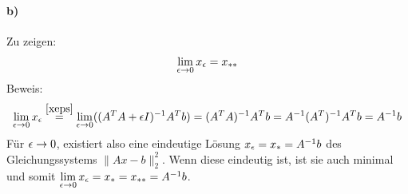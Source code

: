 \paragraph*{b)}
Zu zeigen:
\begin{align*}\lim\limits_{\epsilon \rightarrow 0}{x_\epsilon} = x_{**}\end{align*}
Beweis:
\begin{align}
\lim\limits_{\epsilon \rightarrow 0}{x_\epsilon}\overset{\eqref{xeps}}{=}\lim\limits_{\epsilon \rightarrow 0}((A^TA + \epsilon I)^{-1}A^Tb)=(A^TA)^{-1}A^Tb=A^{-1}(A^{T})^{-1}A^Tb=A^{-1}b
\end{align}
Für $\epsilon\rightarrow 0$, existiert also eine eindeutige Lösung $x_\epsilon=x_*=A^{-1}b$ des Gleichungssystems $\|Ax-b\|_2^{2}$. Wenn diese eindeutig ist, ist sie auch minimal und somit $\lim\limits_{\epsilon \rightarrow 0}{x_\epsilon}=x_*=x_{**}=A^{-1}b$.


